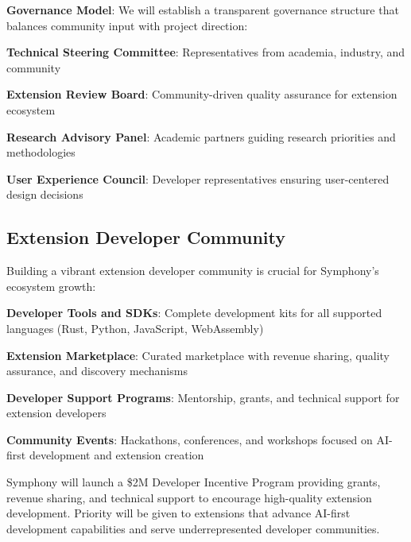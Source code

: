 \textbf{Governance Model}:
We will establish a transparent governance structure that balances community input with project direction:

\begin{compactlist}
    \item \textbf{Technical Steering Committee}: Representatives from academia, industry, and community
    \item \textbf{Extension Review Board}: Community-driven quality assurance for extension ecosystem
    \item \textbf{Research Advisory Panel}: Academic partners guiding research priorities and methodologies
    \item \textbf{User Experience Council}: Developer representatives ensuring user-centered design decisions
\end{compactlist}

\subsection*{Extension Developer Community}

Building a vibrant extension developer community is crucial for Symphony's ecosystem growth:

\begin{expandedlist}
    \item \textbf{Developer Tools and SDKs}: Complete development kits for all supported languages (Rust, Python, JavaScript, WebAssembly)
    \item \textbf{Extension Marketplace}: Curated marketplace with revenue sharing, quality assurance, and discovery mechanisms
    \item \textbf{Developer Support Programs}: Mentorship, grants, and technical support for extension developers
    \item \textbf{Community Events}: Hackathons, conferences, and workshops focused on AI-first development and extension creation
\end{expandedlist}

\begin{infobox}[title=Developer Incentive Program]
Symphony will launch a \$2M Developer Incentive Program providing grants, revenue sharing, and technical support to encourage high-quality extension development. Priority will be given to extensions that advance AI-first development capabilities and serve underrepresented developer communities.
\end{infobox}

